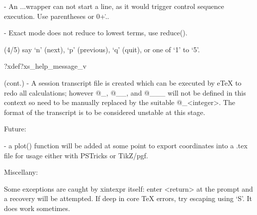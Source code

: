 {{{  - An \xintexpr...\relax wrapper can not start a line, as it would
    trigger control sequence execution.  Use parentheses or 0+\...

  - Exact mode does not reduce to lowest terms, use reduce().

(4/5) say `n' (next), `p' (previous), `q' (quit), or one of `1' to `5'.
}%
?xdef?xs_help_message_v{%
  (cont.)
  - A session transcript file is created which can be executed by
    eTeX to redo all calculations; however @_, @__, and @___ will
    not be defined in this context so need to be manually replaced
    by the suitable @_<integer>.  The format of the transcript
    is to be considered unstable at this stage.

  Future:

  - a plot() function will be added at some point to export
    coordinates into a .tex file for usage either with PSTricks or
    TikZ/pgf.

  Miscellany:

  Some exceptions are caught by xintexpr itself: enter <return> at
  the prompt and a recovery will be attempted.   If deep in core
  TeX errors, try escaping using `S'.  It does work sometimes.

}}}

